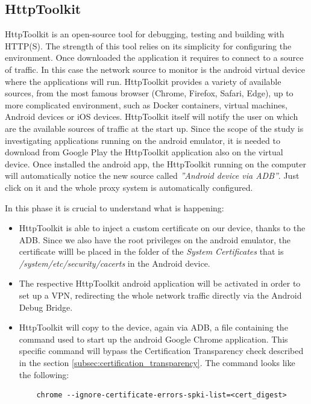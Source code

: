 		\subsection{HttpToolkit}
		\label{sec:http_toolkit}
			\par HttpToolkit\cite{http_toolkit} is an open-source tool for debugging, testing and building with HTTP(S). The strength of this tool relies on its simplicity for configuring the environment. Once downloaded the application it requires to connect to a source of traffic. In this case the network source to monitor is the android virtual device where the applications will run. HttpToolkit provides a variety of available sources, from the most famous browser (Chrome, Firefox, Safari, Edge), up to more complicated environment, such as Docker containers, virtual machines, Android devices or iOS devices. HttpToolkit itself will notify the user on which are the available sources of traffic at the start up. Since the scope of the study is investigating applications running on the android emulator, it is needed to download from Google Play the HttpToolkit application also on the virtual device. Once installed the android app, the HttpToolkit running on the computer will automatically notice the new source called \textit{''Android device via ADB''}. Just click on it and the whole proxy system is automatically configured. \newline
			\par In this phase it is crucial to understand what is happening:
			\begin{itemize}
				\item HttpToolkit is able to inject a custom certificate on our device, thanks to the ADB. Since we also have the root privileges on the android emulator, the certificate willl be placed in the folder of the \textit{System Certificates} that is \textit{/system/etc/security/cacerts} in the Android device. \newline
				\item The respective HttpToolkit android application will be activated in order to set up a VPN, redirecting the whole network traffic directly via the Android Debug Bridge. \newline
				\item HttpToolkit will copy to the device, again via ADB, a file containing the command used to start up the android Google Chrome application. This specific command will bypass the Certification Transparency check described in the section \ref{subsec:certification_transparency}. The command looks like the following:
\begin{lstlisting}
	chrome --ignore-certificate-errors-spki-list=<cert_digest>
\end{lstlisting}
			\end{itemize} 
			
